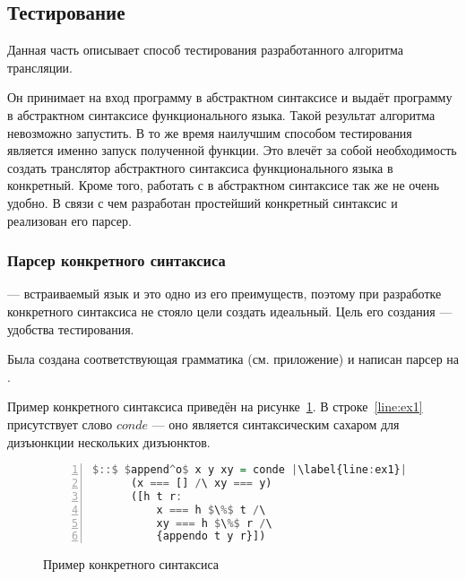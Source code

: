 \subsection{Тестирование}

Данная часть описывает способ тестирования разработанного алгоритма трансляции.

Он принимает на вход программу в абстрактном синтаксисе \miniKanren{} и выдаёт программу в абстрактном синтаксисе функционального языка.
Такой результат алгоритма невозможно запустить.
В то же время наилучшим способом тестирования является именно запуск полученной функции.
Это влечёт за собой необходимость создать транслятор абстрактного синтаксиса функционального языка в конкретный.
Кроме того, работать с \miniKanren{} в абстрактном синтаксисе так же не очень удобно.
В связи с чем разработан простейший конкретный синтаксис \miniKanren{} и реализован его парсер.


\subsubsection{Парсер конкретного синтаксиса \miniKanren{}}

\miniKanren{} --- встраиваемый язык и это одно из его преимуществ, поэтому при разработке конкретного синтаксиса не стояло цели создать идеальный.
Цель его создания --- удобства тестирования.

Была создана соответствующая грамматика (см. приложение) и написан парсер на \haskell{}.

Пример конкретного синтаксиса приведён на рисунке~\ref{lst:ex}.
В строке~\ref{line:ex1} присутствует слово $conde$ --- оно является синтаксическим сахаром для дизъюнкции нескольких дизъюнктов.

\begin{figure}[h!]
  \begin{center}
  \begin{minipage}{0.4\textwidth}
  \begin{lstlisting}[language=Haskell, frame=single, numbers=left,numberstyle=\small, firstnumber=1, escapechar=|]
    $::$ $append^o$ x y xy = conde |\label{line:ex1}|
      (x === [] /\ xy === y)
      ([h t r: 
          x === h $\%$ t /\
          xy === h $\%$ r /\
          {appendo t y r}])     
  \end{lstlisting}
  \end{minipage}
  \end{center}
  \caption{Пример конкретного синтаксиса \miniKanren{}}
  \label{lst:ex}
\end{figure}

